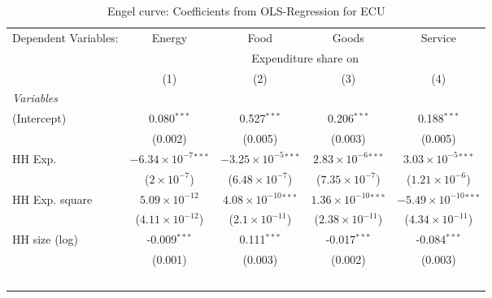 
\begin{table}[htbp!]
   \centering
   \small
   \begin{adjustbox}{width = 1\textwidth, max height = 0.95\textheight, center}
      \begin{threeparttable}[b]
         \caption{\label{tab:Engel_parametric_ECU} Engel curve: Coefficients from OLS-Regression for ECU}
         \begin{tabular}{lcccc}
            \tabularnewline \midrule \midrule
            Dependent Variables: & Energy                         & Food                           & Goods                          & Service\\  
             & \multicolumn{4}{c}{Expenditure share on} \\ 
                                 & (1)                            & (2)                            & (3)                            & (4)\\  
            \midrule
            \emph{Variables}\\
            (Intercept)          & 0.080$^{***}$                  & 0.527$^{***}$                  & 0.206$^{***}$                  & 0.188$^{***}$\\   
                                 & (0.002)                        & (0.005)                        & (0.003)                        & (0.005)\\   
            HH Exp.              & $-6.34\times 10^{-7}$$^{***}$  & $-3.25\times 10^{-5}$$^{***}$  & $2.83\times 10^{-6}$$^{***}$   & $3.03\times 10^{-5}$$^{***}$\\    
                                 & ($2\times 10^{-7}$)            & ($6.48\times 10^{-7}$)         & ($7.35\times 10^{-7}$)         & ($1.21\times 10^{-6}$)\\    
            HH Exp. square       & $5.09\times 10^{-12}$          & $4.08\times 10^{-10}$$^{***}$  & $1.36\times 10^{-10}$$^{***}$  & $-5.49\times 10^{-10}$$^{***}$\\    
                                 & ($4.11\times 10^{-12}$)        & ($2.1\times 10^{-11}$)         & ($2.38\times 10^{-11}$)        & ($4.34\times 10^{-11}$)\\    
            HH size (log)        & -0.009$^{***}$                 & 0.111$^{***}$                  & -0.017$^{***}$                 & -0.084$^{***}$\\   
                                 & (0.001)                        & (0.003)                        & (0.002)                        & (0.003)\\   
$$
\end{tabular}
\end{threeparttable}
\end{adjustbox}
\end{table}
